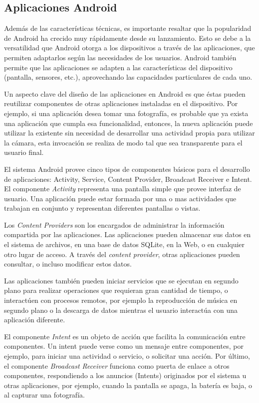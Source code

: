 \subsection{Aplicaciones Android \label{sec:Aplicaciones-Android}}

Además de las características técnicas, es importante resaltar que
la popularidad de Android ha crecido muy rápidamente desde su lanzamiento.
Esto se debe a la versatilidad que Android otorga a los dispositivos
a través de las aplicaciones, que permiten adaptarlos según las necesidades
de los usuarios. Android también permite que las aplicaciones se adapten
a las características del dispositivo (pantalla, sensores, etc.),
aprovechando las capacidades particulares de cada uno. 

Un aspecto clave del diseño de las aplicaciones en Android es que
éstas pueden reutilizar componentes de otras aplicaciones instaladas
en el dispositivo. Por ejemplo, si una aplicación desea tomar una
fotografía, es probable que ya exista una aplicación que cumpla esa
funcionalidad, entonces, la nueva aplicación puede utilizar la existente
sin necesidad de desarrollar una actividad propia para utilizar la
cámara, esta invocación se realiza de modo tal que sea transparente
para el usuario final.

El sistema Android provee cinco tipos de componentes básicos para
el desarrollo de aplicaciones: Activity, Service, Content Provider,
Broadcast Receiver e Intent. El componente \emph{Activity }representa
una pantalla simple que provee interfaz de usuario. Una aplicación
puede estar formada por una o mas actividades que trabajan en conjunto
y representan diferentes pantallas o vistas. 

Los\emph{ Content Providers} son los encargados de administrar la
información compartida por las aplicaciones. Las aplicaciones pueden
almacenar sus datos en el sistema de archivos, en una base de datos
SQLite, en la Web, o en cualquier otro lugar de acceso. A través del
\emph{content provider}, otras aplicaciones pueden consultar, o incluso
modificar estos datos. 

Las aplicaciones también pueden iniciar servicios que se ejecutan
en segundo plano para realizar operaciones que requieran gran cantidad
de tiempo, o interactúen con procesos remotos, por ejemplo la reproducción
de música en segundo plano o la descarga de datos mientras el usuario
interactúa con una aplicación diferente. 

El componente \emph{Intent} es un objeto de acción que facilita la
comunicación entre componentes. Un intent puede verse como un mensaje
entre componentes, por ejemplo, para iniciar una actividad o servicio,
o solicitar una acción. Por último, el componente \emph{Broadcast
Receiver} funciona como puerta de enlace a otros componentes, respondiendo
a los anuncios (Intents) originados por el sistema u otras aplicaciones,
por ejemplo, cuando la pantalla se apaga, la batería es baja, o al
capturar una fotografía. 


